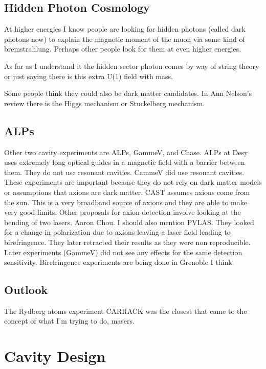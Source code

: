 \documentclass[12pt, twoside]{book}
\begin{document}
\subsection{Hidden Photon Cosmology}

At higher energies I know people are looking for hidden photons (called dark photons now) to explain the magnetic moment of the muon via some kind of bremstrahlung. Perhaps other people look for them at even higher energies.

As far as I understand it the hidden sector photon comes by way of string theory or just saying there is this extra U(1) field with mass.

Some people think they could also be dark matter candidates. In Ann Nelson's review there is the Higgs mechanism or Stuckelberg mechanism.

\subsection{ALPs}

Other two cavity experiments are ALPs, GammeV, and Chase. ALPs at Desy uses extremely long optical guides in a magnetic field with a barrier between them. They do not use resonant cavities. CammeV did use resonant cavities.
These experiments are important because they do not rely on dark matter models or assumptions that axions are dark matter.
CAST assumes axions come from the sun. This is a very broadband source of axions and they are able to make very good limits.
Other proposals for axion detection involve looking at the bending of two lasers. Aaron Chou.
I should also mention PVLAS. They looked for a change in polarization due to axions leaving a laser field leading to birefringence. They later retracted their results as they were non reproducible. Later experiments (GammeV) did not see any effects for the same detection sensitivity.
Birefringence experiments are being done in Grenoble I think.

\subsection{Outlook}

The Rydberg atoms experiment CARRACK was the closest that came to the concept of what I'm trying to do, masers.

\section{Cavity Design}
\end{document}
